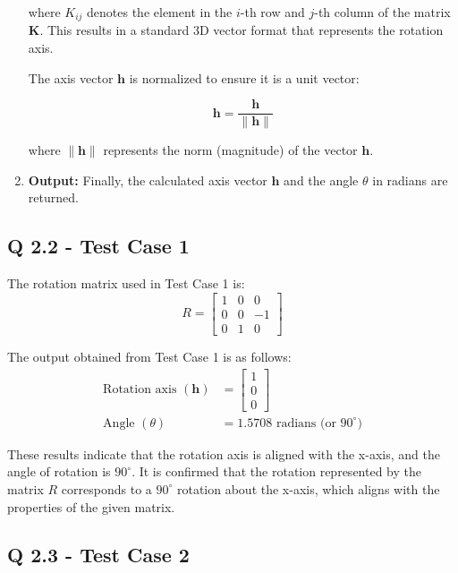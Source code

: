 \begin{enumerate}
    where \( K_{ij} \) denotes the element in the \( i \)-th row and \( j \)-th column of the matrix \( \mathbf{K} \). This results in a standard 3D vector format that represents the rotation axis.
    
    The axis vector \( \mathbf{h} \) is normalized to ensure it is a unit vector:
    
    \begin{equation}
    \mathbf{h} = \frac{\mathbf{h}}{\|\mathbf{h}\|}
    \end{equation}
    
    where \( \|\mathbf{h}\| \) represents the norm (magnitude) of the vector \( \mathbf{h} \).

    \item \textbf{Output:}
    Finally, the calculated axis vector \( \mathbf{h} \) and the angle \( \theta \) in radians are returned.
\end{enumerate}

\subsection{Q 2.2 - Test Case 1}
The rotation matrix used in Test Case 1 is:
\[
R = 
\begin{bmatrix}
1 & 0 & 0 \\
0 & 0 & -1 \\
0 & 1 & 0
\end{bmatrix}
\]

The output obtained from Test Case 1 is as follows:
\begin{align*}
\text{Rotation axis } (\mathbf{h}) &= 
\begin{bmatrix}
1 \\
0 \\
0
\end{bmatrix} \\
\text{Angle } (\theta) &= 1.5708 \text{ radians (or } 90^\circ\text{)}
\end{align*}

These results indicate that the rotation axis is aligned with the x-axis, and the angle of rotation is \( 90^\circ \). It is confirmed that the rotation represented by the matrix \( R \) corresponds to a \( 90^\circ \) rotation about the x-axis, which aligns with the properties of the given matrix.

\subsection{Q 2.3 - Test Case 2}

